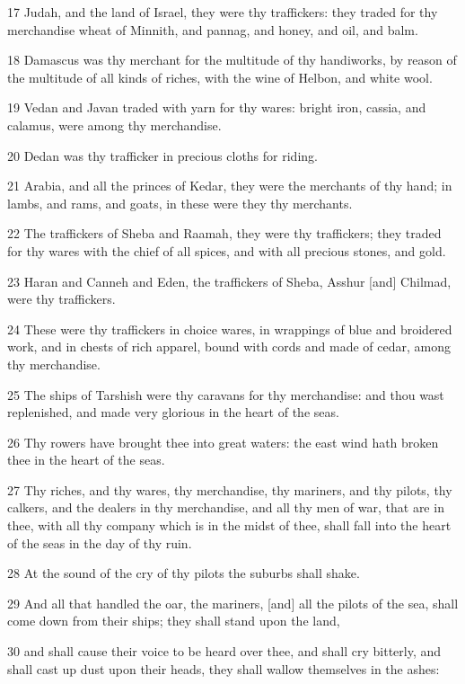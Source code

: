\par 17 Judah, and the land of Israel, they were thy traffickers: they traded for thy merchandise wheat of Minnith, and pannag, and honey, and oil, and balm.
\par 18 Damascus was thy merchant for the multitude of thy handiworks, by reason of the multitude of all kinds of riches, with the wine of Helbon, and white wool.
\par 19 Vedan and Javan traded with yarn for thy wares: bright iron, cassia, and calamus, were among thy merchandise.
\par 20 Dedan was thy trafficker in precious cloths for riding.
\par 21 Arabia, and all the princes of Kedar, they were the merchants of thy hand; in lambs, and rams, and goats, in these were they thy merchants.
\par 22 The traffickers of Sheba and Raamah, they were thy traffickers; they traded for thy wares with the chief of all spices, and with all precious stones, and gold.
\par 23 Haran and Canneh and Eden, the traffickers of Sheba, Asshur [and] Chilmad, were thy traffickers.
\par 24 These were thy traffickers in choice wares, in wrappings of blue and broidered work, and in chests of rich apparel, bound with cords and made of cedar, among thy merchandise.
\par 25 The ships of Tarshish were thy caravans for thy merchandise: and thou wast replenished, and made very glorious in the heart of the seas.
\par 26 Thy rowers have brought thee into great waters: the east wind hath broken thee in the heart of the seas.
\par 27 Thy riches, and thy wares, thy merchandise, thy mariners, and thy pilots, thy calkers, and the dealers in thy merchandise, and all thy men of war, that are in thee, with all thy company which is in the midst of thee, shall fall into the heart of the seas in the day of thy ruin.
\par 28 At the sound of the cry of thy pilots the suburbs shall shake.
\par 29 And all that handled the oar, the mariners, [and] all the pilots of the sea, shall come down from their ships; they shall stand upon the land,
\par 30 and shall cause their voice to be heard over thee, and shall cry bitterly, and shall cast up dust upon their heads, they shall wallow themselves in the ashes:
